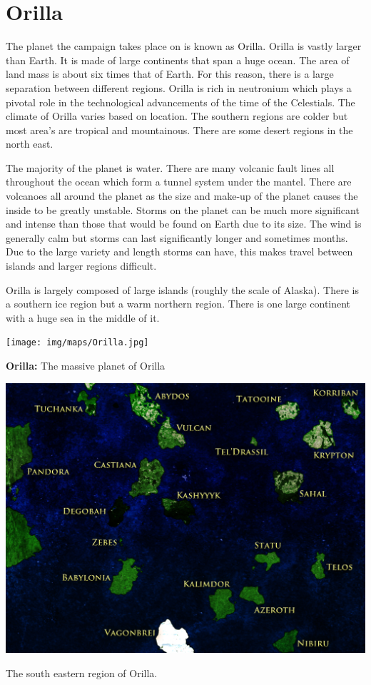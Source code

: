 \section{Orilla}

The planet the campaign takes place on is known as Orilla. Orilla is vastly larger than Earth. It is made of large continents that span a huge ocean. The area of land mass is about six times that of Earth. For this reason, there is a large separation between different regions. Orilla is rich in neutronium which plays a pivotal role in the technological advancements of the time of the Celestials. The climate of Orilla varies based on location. The southern regions are colder but most area's are tropical and mountainous. There are some desert regions in the north east.

The majority of the planet is water. There are many volcanic fault lines all throughout the ocean which form a tunnel system under the mantel. There are volcanoes all around the planet as the size and make-up of the planet causes the inside to be greatly unstable. Storms on the planet can be much more significant and intense than those that would be found on Earth due to its size. The wind is generally calm but storms can last significantly longer and sometimes months. Due to the large variety and length storms can have, this makes travel between islands and larger regions difficult.

Orilla is largely composed of large islands (roughly the scale of Alaska). There is a southern ice region but a warm northern region. There is one large continent with a huge sea in the middle of it.

\begin{center}
	\texttt{[image: img/maps/Orilla.jpg]}
	
	{\textbf{Orilla:} The massive planet of Orilla}
\end{center}

\begin{center}
	\includegraphics[width=0.7\linewidth]{img/maps/Orilla_SE.jpg}
	
	{The south eastern region of Orilla.}
\end{center}

